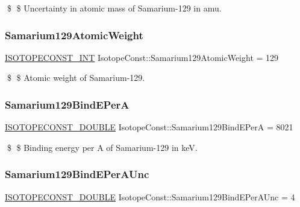 \$ \$ Uncertainty in atomic mass of Samarium-\/129 in amu. \mbox{\label{group___isotope_const-_samarium-_sm129_gaaef8cef7a542f6e0c1012222b080ecb9}} 
\subsubsection{\texorpdfstring{Samarium129\+Atomic\+Weight}{Samarium129AtomicWeight}}
{\footnotesize\ttfamily \mbox{\hyperlink{group___isotope_const-_macros_ga5f18360b3e99483a35c32d789e62621c}{I\+S\+O\+T\+O\+P\+E\+C\+O\+N\+S\+T\+\_\+\+I\+NT}} Isotope\+Const\+::\+Samarium129\+Atomic\+Weight = 129}

\$ \$ Atomic weight of Samarium-\/129. \mbox{\label{group___isotope_const-_samarium-_sm129_ga62aff41dd3483861cf99ddec274c4ca2}} 
\subsubsection{\texorpdfstring{Samarium129\+Bind\+E\+PerA}{Samarium129BindEPerA}}
{\footnotesize\ttfamily \mbox{\hyperlink{group___isotope_const-_macros_ga8f45a7272ce02c0b4c65c44636ed719a}{I\+S\+O\+T\+O\+P\+E\+C\+O\+N\+S\+T\+\_\+\+D\+O\+U\+B\+LE}} Isotope\+Const\+::\+Samarium129\+Bind\+E\+PerA = 8021}

\$ \$ Binding energy per A of Samarium-\/129 in keV. \mbox{\label{group___isotope_const-_samarium-_sm129_gafa7583fcba7b45b383c3ab3ba8a07b48}} 
\subsubsection{\texorpdfstring{Samarium129\+Bind\+E\+Per\+A\+Unc}{Samarium129BindEPerAUnc}}
{\footnotesize\ttfamily \mbox{\hyperlink{group___isotope_const-_macros_ga8f45a7272ce02c0b4c65c44636ed719a}{I\+S\+O\+T\+O\+P\+E\+C\+O\+N\+S\+T\+\_\+\+D\+O\+U\+B\+LE}} Isotope\+Const\+::\+Samarium129\+Bind\+E\+Per\+A\+Unc = 4}

